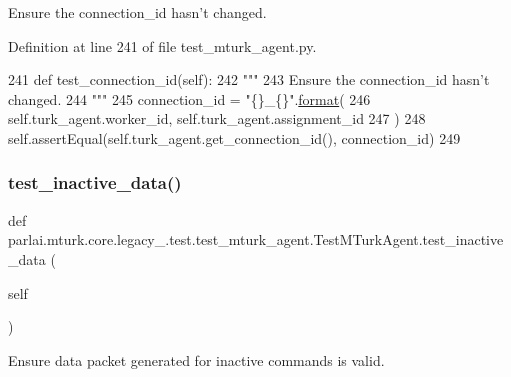 \begin{DoxyVerb}Ensure the connection_id hasn't changed.
\end{DoxyVerb}
 

Definition at line 241 of file test\+\_\+mturk\+\_\+agent.\+py.


\begin{DoxyCode}
241     \textcolor{keyword}{def }test\_connection\_id(self):
242         \textcolor{stringliteral}{"""}
243 \textcolor{stringliteral}{        Ensure the connection\_id hasn't changed.}
244 \textcolor{stringliteral}{        """}
245         connection\_id = \textcolor{stringliteral}{"\{\}\_\{\}"}.\hyperlink{namespaceparlai_1_1chat__service_1_1services_1_1messenger_1_1shared__utils_a32e2e2022b824fbaf80c747160b52a76}{format}(
246             self.turk\_agent.worker\_id, self.turk\_agent.assignment\_id
247         )
248         self.assertEqual(self.turk\_agent.get\_connection\_id(), connection\_id)
249 
\end{DoxyCode}
\mbox{\label{classparlai_1_1mturk_1_1core_1_1legacy__2018_1_1test_1_1test__mturk__agent_1_1TestMTurkAgent_a9b5a89daa42f7c6b978912c5cdb2d558}} 
\subsubsection{\texorpdfstring{test\+\_\+inactive\+\_\+data()}{test\_inactive\_data()}}
{\footnotesize\ttfamily def parlai.\+mturk.\+core.\+legacy\+\_.\+test.\+test\+\_\+mturk\+\_\+agent.\+Test\+M\+Turk\+Agent.\+test\+\_\+inactive\+\_\+data (\begin{DoxyParamCaption}\item[{}]{self }\end{DoxyParamCaption})}

\begin{DoxyVerb}Ensure data packet generated for inactive commands is valid.
\end{DoxyVerb}
 

